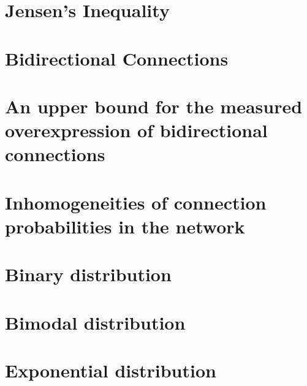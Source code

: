 \documentclass{scrreprt}
\begin{document}
  

\section{Jensen's Inequality}

  

\section{Bidirectional Connections}

  

\section{An upper bound for the measured overexpression of bidirectional connections}

  

\section{Inhomogeneities of connection probabilities in the network}

  
  
\section{Binary distribution}

    

\section{Bimodal distribution}
  
\section{Exponential distribution}
\end{document}
